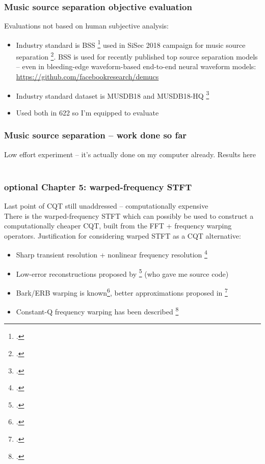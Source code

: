 \documentclass[usenames,dvipsnames]{beamer}
\begin{document}
\begin{frame}
	\frametitle{Music source separation objective evaluation}
	Evaluations not based on human subjective analysis:
	\begin{itemize}
		\item
			Industry standard is BSS \footcite{bss} used in SiSec 2018 campaign for music source separation \footcite{sigsep2018}. BSS is used for recently published top source separation models -- even in bleeding-edge waveform-based end-to-end neural waveform models: \href{https://github.com/facebookresearch/demucs}{https://github.com/facebookresearch/demucs}
		\item
			Industry standard dataset is MUSDB18 and MUSDB18-HQ \footcite{musdb18, musdb18-hq}
		\item
			Used both in 622 so I'm equipped to evaluate
	\end{itemize}
\end{frame}

\begin{frame}
	\frametitle{Music source separation -- work done so far}
	Low effort experiment -- it's actually done on my computer already. Results here\\\ \\
\end{frame}

\begin{frame}
	\frametitle{\textbf{optional} Chapter 5: warped-frequency STFT}
	Last point of CQT still unaddressed -- computationally expensive\\
	\vspace{1em}
	There is the warped-frequency STFT which can possibly be used to construct a computationally cheaper CQT, built from the FFT + frequency warping operators. Justification for considering warped STFT as a CQT alternative:
	\begin{itemize}
		\item
			Sharp transient resolution + nonlinear frequency resolution \footcite{warpwabnik}
		\item
			Low-error reconstructions proposed by \footcite{makur2008} (who gave me source code)
		\item
			Bark/ERB warping is known\footcite{barkerb}, better approximations proposed in \footcite{betterwarp}
		\item
			Constant-Q frequency warping has been described \footcite{cqwarp}
	\end{itemize}
\end{frame}
\end{document}
